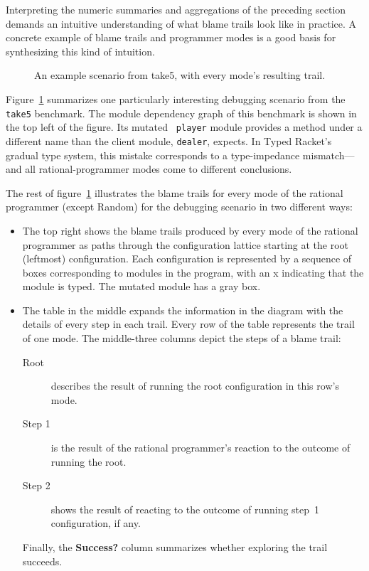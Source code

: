 Interpreting the numeric summaries and aggregations of the preceding section
demands an intuitive understanding of what blame trails look like in practice.
A concrete example of blame trails and programmer modes is a good basis for
synthesizing this kind of intuition.

\begin{figure}

\caption{An example scenario from take5, with every mode's resulting trail.}
\label{fig:example-trails}
\end{figure}

Figure~\ref{fig:example-trails} summarizes one particularly interesting
debugging scenario from the {\tt take5} benchmark. The module dependency graph
of this benchmark is shown in the top left of the figure. Its mutated {\tt
player} module provides a method under a different name than the client module,
{\tt dealer}, expects. In Typed Racket's gradual type system, this mistake
corresponds to a type-impedance mismatch---and all rational-programmer modes
come to different conclusions. 

The rest of figure~\ref{fig:example-trails} illustrates the blame trails for
every mode of the rational programmer (except Random) for the debugging scenario
in two different ways:
\begin{itemize}

\item The top right shows the blame trails produced by every mode of the rational programmer as paths through the configuration lattice starting at the
root (leftmost) configuration. Each configuration is represented by a sequence of boxes corresponding to modules in the program, with an x indicating that the module is typed.
The mutated module has a gray box.

\item The table in the middle expands the information in the diagram with the details of every step in each trail.
Every row of the table represents the trail of one mode. The middle-three columns depict the steps of a blame trail:
\begin{description}
\item[Root] describes the result of running the root configuration in this row's mode.
\item[Step 1] is the result of the rational programmer's reaction to the outcome of running the root. 
\item[Step 2] shows the result of reacting to the outcome of running step~1 configuration, if any. 
\end{description}
Finally, the \textbf{Success?} column summarizes whether exploring the trail succeeds.

\end{itemize}

